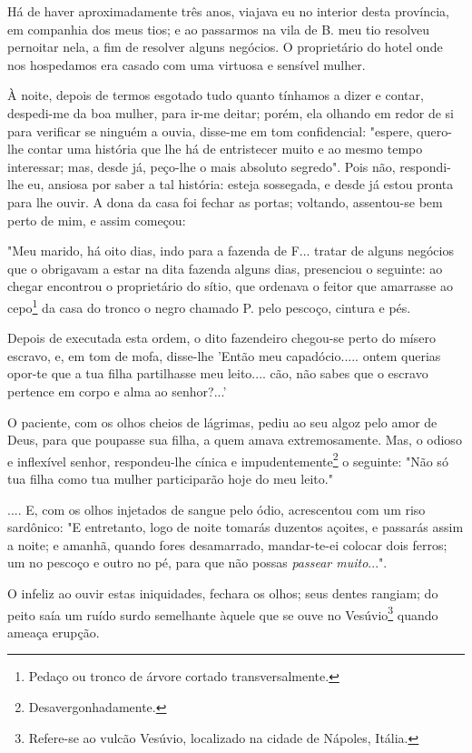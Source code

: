 Há de haver aproximadamente três anos, viajava eu no interior desta
província, em companhia dos meus tios; e ao passarmos na vila de B. meu
tio resolveu pernoitar nela, a fim de resolver alguns negócios. O
proprietário do hotel onde nos hospedamos era casado com uma virtuosa e
sensível mulher.

À noite, depois de termos esgotado tudo quanto tínhamos a dizer e
contar, despedi-me da boa mulher, para ir-me deitar; porém, ela olhando
em redor de si para verificar se ninguém a ouvia, disse-me em tom
confidencial: "espere, quero-lhe contar uma história que lhe há de
entristecer muito e ao mesmo tempo interessar; mas, desde já, peço-lhe o
mais absoluto segredo". Pois não, respondi-lhe eu, ansiosa por saber a
tal história: esteja sossegada, e desde já estou pronta para lhe ouvir.
A dona da casa foi fechar as portas; voltando, assentou-se bem perto de
mim, e assim começou:

"Meu marido, há oito dias, indo para a fazenda de F... tratar de alguns
negócios que o obrigavam a estar na dita fazenda alguns dias, presenciou
o seguinte: ao chegar encontrou o proprietário do sítio, que ordenava o
feitor que amarrasse ao cepo\footnote{Pedaço ou tronco de árvore
  cortado transversalmente.} da casa do tronco o negro chamado P. pelo
pescoço, cintura e pés.

Depois de executada esta ordem, o dito fazendeiro chegou-se perto do
mísero escravo, e, em tom de mofa, disse-lhe 'Então meu capadócio.....
ontem querias opor-te que a tua filha partilhasse meu leito.... cão, não
sabes que o escravo pertence em corpo e alma ao senhor?...'

O paciente, com os olhos cheios de lágrimas, pediu ao seu algoz pelo
amor de Deus, para que poupasse sua filha, a quem amava extremosamente.
Mas, o odioso e inflexível senhor, respondeu-lhe cínica e
impudentemente\footnote{Desavergonhadamente.} o seguinte: "Não só tua
filha como tua mulher participarão hoje do meu leito."

.... E, com os olhos injetados de sangue pelo ódio, acrescentou com um
riso sardônico: "E entretanto, logo de noite tomarás duzentos açoites, e
passarás assim a noite; e amanhã, quando fores desamarrado, mandar-te-ei
colocar dois ferros; um no pescoço e outro no pé, para que não possas
\emph{passear muito}...".

O infeliz ao ouvir estas iniquidades, fechara os olhos; seus dentes
rangiam; do peito saía um ruído surdo semelhante àquele que se ouve no
Vesúvio\footnote{Refere-se ao vulcão Vesúvio, localizado na cidade de
  Nápoles, Itália.} quando ameaça erupção.


